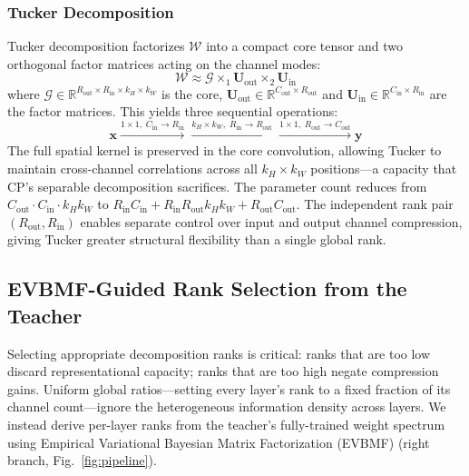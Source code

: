 \documentclass[conference]{IEEEtran}
\begin{document}
\subsubsection{Tucker Decomposition}
\par
Tucker decomposition \cite{kim2015compression} factorizes
$\mathcal{W}$ into a compact core tensor and two orthogonal factor
matrices acting on the channel modes:
\begin{equation}
    \mathcal{W} \approx
    \mathcal{G} \times_1 \mathbf{U}_{\mathrm{out}}
                \times_2 \mathbf{U}_{\mathrm{in}}
\end{equation}
where $\mathcal{G} \in \mathbb{R}^{R_{\mathrm{out}} \times
R_{\mathrm{in}} \times k_H \times k_W}$ is the core,
$\mathbf{U}_{\mathrm{out}} \in \mathbb{R}^{C_{\mathrm{out}} \times
R_{\mathrm{out}}}$ and $\mathbf{U}_{\mathrm{in}} \in
\mathbb{R}^{C_{\mathrm{in}} \times R_{\mathrm{in}}}$ are the factor
matrices. This yields three sequential operations:
\begin{equation}
    \mathbf{x}
    \xrightarrow{1\times 1,\; C_{\mathrm{in}} \to R_{\mathrm{in}}}
    \xrightarrow{k_H \times k_W,\; R_{\mathrm{in}} \to R_{\mathrm{out}}}
    \xrightarrow{1\times 1,\; R_{\mathrm{out}} \to C_{\mathrm{out}}}
    \mathbf{y}
\end{equation}
The full spatial kernel is preserved in the core convolution,
allowing Tucker to maintain cross-channel correlations across
all $k_H \times k_W$ positions—a capacity that CP's separable
decomposition sacrifices. The parameter count reduces from
$C_{\mathrm{out}} \cdot C_{\mathrm{in}} \cdot k_H k_W$ to
$R_{\mathrm{in}} C_{\mathrm{in}} + R_{\mathrm{in}} R_{\mathrm{out}}
k_H k_W + R_{\mathrm{out}} C_{\mathrm{out}}$. The independent
rank pair $(R_{\mathrm{out}}, R_{\mathrm{in}})$ enables separate
control over input and output channel compression, giving Tucker
greater structural flexibility than a single global rank.


\subsection{EVBMF-Guided Rank Selection from the Teacher}
\label{sec:evbmf}
\par
Selecting appropriate decomposition ranks is critical: ranks that are
too low discard representational capacity; ranks that are too high
negate compression gains. Uniform global ratios—setting every layer's
rank to a fixed fraction of its channel count—ignore the heterogeneous
information density across layers. We instead derive per-layer ranks
from the teacher's fully-trained weight spectrum using Empirical
Variational Bayesian Matrix Factorization (EVBMF)
\cite{nakajima2013global} (right branch, Fig.~\ref{fig:pipeline}).
\end{document}
